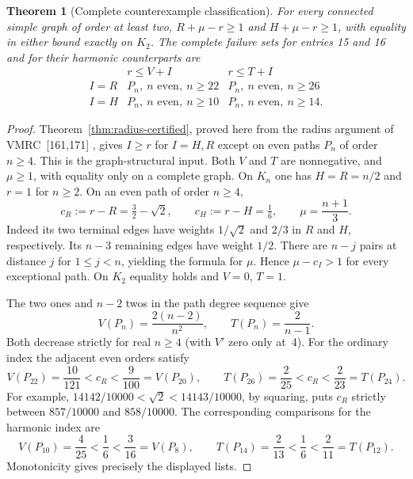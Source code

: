 \documentclass[11pt,a4paper]{article}
\newtheorem{theorem}{Theorem}[section]
\begin{document}
\begin{theorem}[Complete counterexample classification]\label{thm:cat-cuts}
For every connected simple graph of order at least two,
$R+\mu-r\ge1$ and $H+\mu-r\ge1$, with equality in either bound
exactly on $K_2$. The complete failure sets for entries 15 and 16 and
for their harmonic counterparts are
\[
\begin{array}{c|cc}
 &r\le V+I&r\le T+I\\\hline
 I=R&P_n,\ n\text{ even},\ n\ge22 & P_n,\ n\text{ even},\ n\ge26\\
 I=H&P_n,\ n\text{ even},\ n\ge10 & P_n,\ n\text{ even},\ n\ge14 .
\end{array}
\]
\end{theorem}
\begin{proof}
Theorem~\ref{thm:radius-certified}, proved here from the radius argument of
VMRC~[161,171] \cite{cat-rad,cat-harm}, gives $I\ge r$ for $I=H,R$
except on even paths $P_n$ of order $n\ge4$.
This is the graph-structural input. Both $V$ and $T$ are nonnegative,
and $\mu\ge1$, with equality only on a complete graph. On $K_n$ one has
$H=R=n/2$ and $r=1$ for $n\ge2$. On an even path of order $n\ge4$,
\[
 c_R:=r-R=\tfrac32-\sqrt2,\qquad c_H:=r-H=\tfrac16,
 \qquad \mu=\frac{n+1}{3}.
\]
Indeed its two terminal edges have weights $1/\sqrt2$ and $2/3$ in
$R$ and $H$, respectively. Its $n-3$ remaining edges have weight $1/2$.
There are $n-j$ pairs at distance $j$ for $1\le j<n$, yielding the
formula for $\mu$. Hence $\mu-c_I>1$ for every exceptional path.
On $K_2$ equality holds and $V=0$, $T=1$.

The two ones and $n-2$ twos in the path degree sequence give
\[
 V(P_n)=\frac{2(n-2)}{n^2},\qquad T(P_n)=\frac2{n-1}.
\]
Both decrease strictly for real $n\ge4$ (with $V'$ zero only at~4).
For the ordinary index the adjacent even orders satisfy
\[
 V(P_{22})=\frac{10}{121}<c_R<\frac9{100}=V(P_{20}),\qquad
 T(P_{26})=\frac2{25}<c_R<\frac2{23}=T(P_{24}).
\]
For example, $14142/10000<\sqrt2<14143/10000$, by squaring, puts
$c_R$ strictly between $857/10000$ and $858/10000$.
The corresponding comparisons for the harmonic index are
\[
 V(P_{10})=\frac4{25}<\frac16<\frac3{16}=V(P_8),\qquad
 T(P_{14})=\frac2{13}<\frac16<\frac2{11}=T(P_{12}).
\]
Monotonicity gives precisely the displayed lists.
\end{proof}
\end{document}

